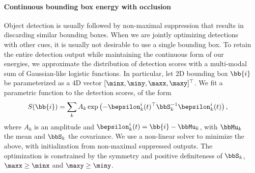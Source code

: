 \vspace{-0.3cm}
\paragraph{Continuous bounding box energy with occlusion}
Object detection is usually followed by non-maximal suppression that results in discarding similar bounding boxes. When we are jointly optimizing detections with other cues, it is usually not desirable to use a single bounding box. To retain the entire detection output while maintaining the continuous form of our energies, we approximate the distribution of detection scores with a multi-modal sum of Gaussian-like logistic functions. In particular, let 2D bounding box $\bb{i}$ be parameterized as a 4D vector $[\minx, \miny, \maxx, \maxy]^\top$. We fit a parametric function to the detection scores, of the form
\begin{equation}
S(\bb{i}) = \sum_k A_k \exp \left( -\bepsilon_k^{i}(t)^\top \bbS_k^{-1} \bepsilon_k^{i}(t) \right),
\label{eq:GMMscores}
\end{equation}
where $A_k$ is an amplitude and $\bepsilon_k^{i}(t) = \bb{i}-\bbMu_k$, with $\bbMu_k$ the mean and $\bbS_k$ the covariance.
We use a non-linear solver to minimize the above, with initialization from non-maximal suppressed outputs. The optimization is constrained by the symmetry and positive definiteness of $\bbS_k$, $\maxx \ge \minx$ and $\maxy \ge \miny$.

